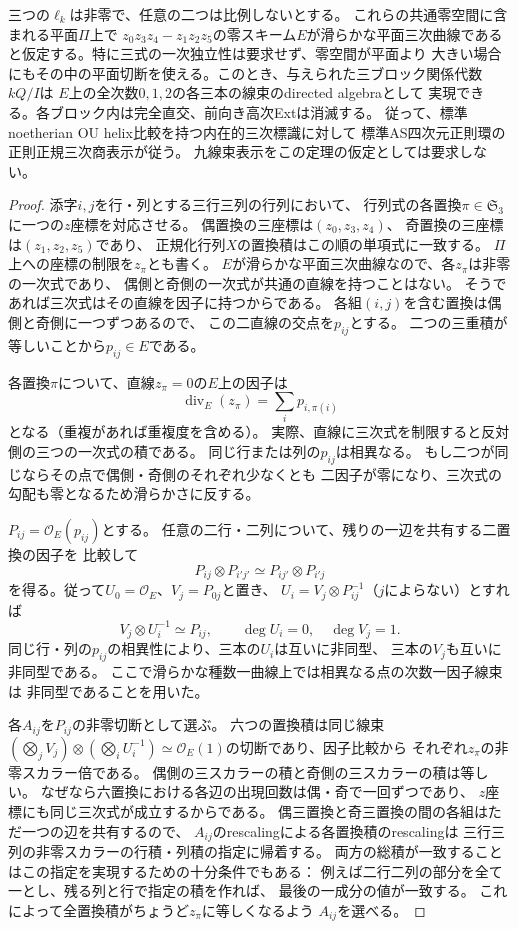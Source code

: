 \begin{theorem}[滑らかな行列式平面からの九線束の回復]
\label{thm:ou-smooth-determinant-reconstruction}
三つの$\ell_k$は非零で、任意の二つは比例しないとする。
これらの共通零空間に含まれる平面$\Pi$上で
$z_0z_3z_4-z_1z_2z_5$の零スキーム$E$が滑らかな平面三次曲線である
と仮定する。特に三式の一次独立性は要求せず、零空間が平面より
大きい場合にもその中の平面切断を使える。このとき、与えられた三ブロック関係代数$kQ/I$は
$E$上の全次数$0,1,2$の各三本の線束のdirected algebraとして
実現できる。各ブロック内は完全直交、前向き高次Extは消滅する。
従って、標準noetherian OU helix比較を持つ内在的三次標識に対して
標準AS四次元正則環の正則正規三次商表示が従う。
九線束表示をこの定理の仮定としては要求しない。
\end{theorem}
\begin{proof}
添字$i,j$を行・列とする三行三列の行列において、
行列式の各置換$\pi\in\mathfrak S_3$に一つの$z$座標を対応させる。
偶置換の三座標は$(z_0,z_3,z_4)$、
奇置換の三座標は$(z_1,z_2,z_5)$であり、
正規化行列$X$の置換積はこの順の単項式に一致する。
$\Pi$上への座標の制限を$z_\pi$とも書く。
$E$が滑らかな平面三次曲線なので、各$z_\pi$は非零の一次式であり、
偶側と奇側の一次式が共通の直線を持つことはない。
そうであれば三次式はその直線を因子に持つからである。
各組$(i,j)$を含む置換は偶側と奇側に一つずつあるので、
この二直線の交点を$p_{ij}$とする。
二つの三重積が等しいことから$p_{ij}\in E$である。

各置換$\pi$について、直線$z_\pi=0$の$E$上の因子は
\[
 \operatorname{div}_E(z_\pi)=\sum_i p_{i,\pi(i)}
\]
となる（重複があれば重複度を含める）。
実際、直線に三次式を制限すると反対側の三つの一次式の積である。
同じ行または列の$p_{ij}$は相異なる。
もし二つが同じならその点で偶側・奇側のそれぞれ少なくとも
二因子が零になり、三次式の勾配も零となるため滑らかさに反する。

$P_{ij}=\mathcal O_E(p_{ij})$とする。
任意の二行・二列について、残りの一辺を共有する二置換の因子を
比較して
\[
 P_{ij}\otimes P_{i'j'}\simeq P_{ij'}\otimes P_{i'j}
\]
を得る。従って$U_0=\mathcal O_E$、$V_j=P_{0j}$と置き、
$U_i=V_j\otimes P_{ij}^{-1}$（$j$によらない）とすれば
\[
 V_j\otimes U_i^{-1}\simeq P_{ij},\qquad
 \deg U_i=0,\quad \deg V_j=1.
\]
同じ行・列の$p_{ij}$の相異性により、三本の$U_i$は互いに非同型、
三本の$V_j$も互いに非同型である。
ここで滑らかな種数一曲線上では相異なる点の次数一因子線束は
非同型であることを用いた。

各$A_{ij}$を$P_{ij}$の非零切断として選ぶ。
六つの置換積は同じ線束
$(\bigotimes_jV_j)\otimes(\bigotimes_iU_i^{-1})
\simeq\mathcal O_E(1)$の切断であり、因子比較から
それぞれ$z_\pi$の非零スカラー倍である。
偶側の三スカラーの積と奇側の三スカラーの積は等しい。
なぜなら六置換における各辺の出現回数は偶・奇で一回ずつであり、
$z$座標にも同じ三次式が成立するからである。
偶三置換と奇三置換の間の各組はただ一つの辺を共有するので、
$A_{ij}$のrescalingによる各置換積のrescalingは
三行三列の非零スカラーの行積・列積の指定に帰着する。
両方の総積が一致することはこの指定を実現するための十分条件でもある：
例えば二行二列の部分を全て一とし、残る列と行で指定の積を作れば、
最後の一成分の値が一致する。
これによって全置換積がちょうど$z_\pi$に等しくなるよう
$A_{ij}$を選べる。


\end{proof}

